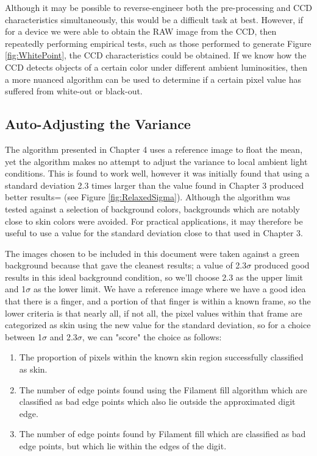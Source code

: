 Although it may be possible to reverse-engineer both the pre-processing and CCD characteristics simultaneously, this would be a difficult task at best. However, if for a device we were able to obtain the RAW image from the CCD, then repeatedly performing empirical tests, such as those performed to generate Figure \ref{fig:WhitePoint}, the CCD characteristics could be obtained. If we know how the CCD detects objects of a certain color under different ambient luminosities, then a more nuanced algorithm can be used to determine if a certain pixel value has suffered from white-out or black-out.

\subsection{Auto-Adjusting the Variance}\label{sec:AutoAdjustingTheVariance}
The algorithm presented in Chapter 4 uses a reference image to float the mean, yet the algorithm makes no attempt to adjust the variance to local ambient light conditions. This is found to work well, however it was initially found that using a standard deviation 2.3 times larger than the value found in Chapter 3 produced better results= (see Figure \ref{fig:RelaxedSigma}). Although the algorithm was tested against a selection of background colors, backgrounds which are notably close to skin colors were avoided. For practical applications, it may therefore be useful to use a value for the standard deviation close to that used in Chapter 3.

The images chosen to be included in this document were taken against a green background because that gave the cleanest results; a value of 2.3$\sigma$ produced good results in this ideal background condition, so we'll choose 2.3 as the upper limit and 1$\sigma$ as the lower limit. We have a reference image where we have a good idea that there is a finger, and a portion of that finger is within a known frame, so the lower criteria is that nearly all, if not all, the pixel values within that frame are categorized as skin using the new value for the standard deviation, so for a choice between 1$\sigma$ and 2.3$\sigma$, we can "score" the choice as follows:

\begin{enumerate}
\item The proportion of pixels within the known skin region successfully classified as skin.
\item The number of edge points found using the Filament fill algorithm which are classified as bad edge points which also lie outside the approximated digit edge.
\item The number of edge points found by Filament fill which are classified as bad edge points, but which lie within the edges of the digit.
\end{enumerate}

